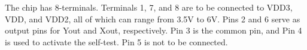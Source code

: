 \documentclass[12pt]{article}
\begin{document}
The chip has 8-terminals. Terminals 1, 7, and 8 are to be connected to VDD3, VDD, and VDD2, all of which
can range from 3.5V to 6V. Pins 2 and 6 serve as output pins for Yout and Xout, respectively. 
Pin 3 is the common pin, and Pin 4 is used to activate the self-test. Pin 5 is not to be connected. 
\end{document}
